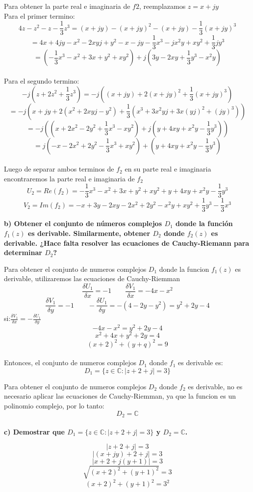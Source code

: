 \documentclass[12pt]{report}
\begin{document}
Para obtener la parte real e imaginaria de $f2$, reemplazamos $z=x+jy$\\
Para el primer termino:
$$4z - z^2 - z - \frac{1}{3}z^3=(x+jy) - (x+jy)^2 - (x+jy) - \frac{1}{3}(x+jy)^3$$
$$=4x + 4jy -x^2 -2xyj + y^2 -x -jy - \frac{1}{3}x^3 - jx^2y + xy^2 + \frac{1}{3}jy^3$$
$$=(- \frac{1}{3}x^3 -x^2 + 3x + y^2 + xy^2) +j(3y -2xy + \frac{1}{3}y^3 - x^2y )$$ \\
Para el segundo termino:
$$-j (z + 2z^2 + \frac{1}{3}z^3) = -j ((x+jy) + 2(x+jy)^2 + \frac{1}{3}(x+jy)^3)$$
$$=-j (x+jy + 2(x^2+2xyj-y^2) + \frac{1}{3}(x^3 + 3x^2yj + 3x(yj)^2 + (jy)^3))$$
$$=-j ((x + 2x^2 - 2y^2 + \frac{1}{3} x^3 - xy^2) + j( y +4xy + x^2y - \frac{1}{3}y^3))$$
$$=j(-x - 2x^2 + 2y^2 - \frac{1}{3} x^3 + xy^2) + ( y +4xy + x^2y - \frac{1}{3}y^3)$$\\
Luego de separar ambos terminos de $f_2$ en su parte real e imaginaria encontraremos la parte real
e imaginaria de $f_2$
$$U_2=Re(f_2)=- \frac{1}{3}x^3 - x^2 + 3x + y^2 + xy^2 + y +4xy + x^2y - \frac{1}{3}y^3$$
$$V_2=Im(f_2)=-x + 3y -2xy - 2x^2 + 2y^2 - x^2y + xy^2 + \frac{1}{3}y^3 - \frac{1}{3} x^3$$

\textbf{b) Obtener el conjunto de números complejos $D_1$ donde la función $f_1(z)$ es derivable. Similarmente, obtener $D_2$ donde $f_2(z)$ es derivable.
¿Hace falta resolver las ecuaciones de Cauchy-Riemann para determinar $D_2$?}

Para obtener el conjunto de numeros complejos $D_1$ donde la funcion $f_1(z)$ es derivable, utilizaremos las ecuaciones de Cauchy-Riemman
$$\frac{\delta U_1}{\delta x}=-1 \quad \quad \frac{\delta V_1}{\delta x}=-4x-x^2$$
$$\frac{\delta V_1}{\delta y}=-1 \quad \quad - \frac{\delta U_1}{\delta y}=-(4-2y-y^2)=y^2+2y-4$$
si:$\frac{\delta V_1}{\delta x}=-\frac{\delta U_1}{\delta y}$
$$-4x-x^2=y^2+2y-4$$
$$x^2+4x+y^2+2y=4$$
$$(x+2)^2+(y+q)^2=9$$\\
Entonces, el conjunto de numeros complejos $D_1$ donde $f_1$ es derivable es:
$$D_1 = \{z \in \mathbb{C} : |z + 2 + j| = 3\}$$

Para obtener el conjunto de numeros complejos $D_2$ donde $f_2$ es derivable, no es necesario aplicar las ecuaciones de Cauchy-Riemman,
ya que la funcion es un polinomio complejo, por lo tanto:
$$D_2=\mathbb{C}$$\\

\textbf{c) Demostrar que $D_1 = \{z \in \mathbb{C} : |z + 2 + j| = 3\}$ y $D_2 = \mathbb{C}$.}

$$|z+2+j|=3$$
$$|(x+jy)+2+j|=3$$
$$|x+2+j(y+1)|=3$$
$$\sqrt{(x+2)^2+(y+1)^2}=3$$
$$(x+2)^2+(y+1)^2=3^2$$\\
\end{document}
